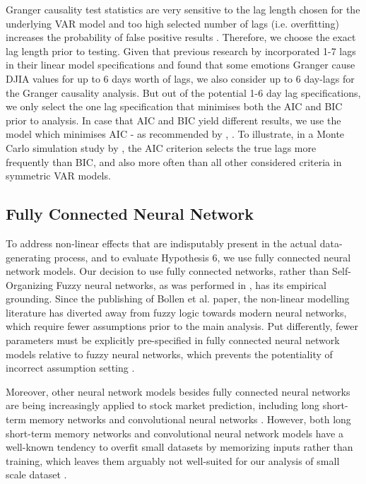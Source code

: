 Granger causality test statistics are very sensitive to the lag length chosen for the underlying VAR model and too high selected number of lags (i.e. overfitting) increases the probability of false positive results \parencite{bruns2019lag}. Therefore, we choose the exact lag length prior to testing. Given that previous research by \textcite{bollen2011twitter} incorporated 1-7 lags in their linear model specifications and found that some emotions Granger cause DJIA values for up to 6 days worth of lags, we also consider up to 6 day-lags for the Granger causality analysis. But out of the potential 1-6 day lag specifications, we only select the one lag specification that minimises both the AIC \parencite{akaike1974new} and BIC \parencite{schwarz1978estimating} prior to analysis. In case that AIC and BIC yield different results, we use the model which minimises AIC - as recommended by \textcite{thornton1985lag}, \textcite{ozcicek1999lag}. To illustrate, in a Monte Carlo simulation study by \textcite{ozcicek1999lag}, the AIC criterion selects the true lags more frequently than BIC, and also more often than all other considered criteria in symmetric VAR models. 


\subsection{Fully Connected Neural Network}

To address non-linear effects that are indisputably present in the actual data-generating process, and to evaluate Hypothesis 6, we use fully connected neural network models. Our decision to use fully connected networks, rather than Self-Organizing Fuzzy neural networks, as was performed in \textcite{bollen2011twitter}, has its empirical grounding. Since the publishing of Bollen et al. paper, the non-linear modelling literature has diverted away from fuzzy logic towards modern neural networks, which require fewer assumptions prior to the main analysis. Put differently, fewer parameters must be explicitly pre-specified in fully connected neural network models relative to fuzzy neural networks, which prevents the potentiality of incorrect assumption setting \parencite{goodfellow2016deep}. 

Moreover, other neural network models besides fully connected neural networks are being increasingly applied to stock market prediction, including long short-term memory networks and convolutional neural networks  \parencite{fischer2018deep, chen2018stock}. However, both long short-term memory networks and convolutional neural network models have a well-known tendency to overfit small datasets by memorizing inputs rather than training, which leaves them arguably not well-suited for our analysis of small scale dataset \parencite{hochreiter1997lstm, lecun1989backpropagation}. 

